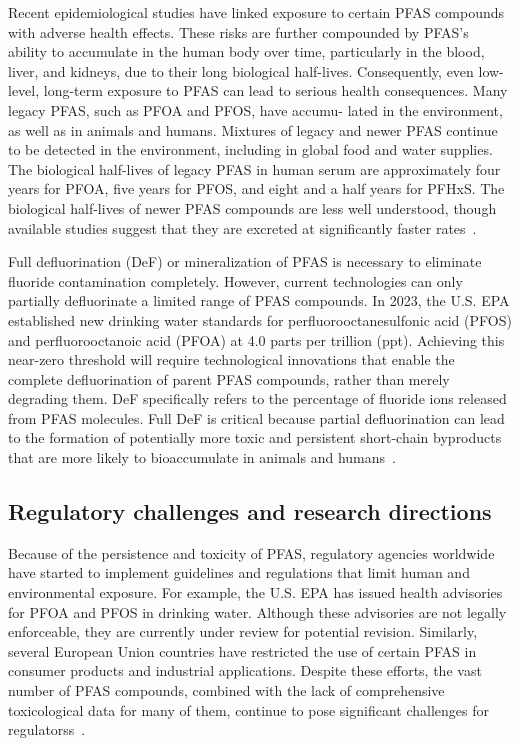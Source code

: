 Recent epidemiological studies have linked exposure to certain PFAS compounds with adverse health effects. These risks are further compounded by PFAS’s ability to accumulate in the human body over time, particularly in the blood, liver, and kidneys, due to their long biological half-lives. Consequently, even low-level, long-term exposure to PFAS can lead to serious health consequences. Many legacy PFAS, such as PFOA and PFOS, have accumu- lated in the environment, as well as in animals and humans. Mixtures of legacy and newer PFAS continue to be detected in the environment, including in global food and water supplies. The biological half-lives of legacy PFAS in human serum are approximately four years for PFOA, five years for PFOS, and eight and a half years for PFHxS. The biological half-lives of newer PFAS compounds are less well understood, though available studies suggest that they are excreted at significantly faster rates~\cite{4}.

Full defluorination (DeF) or mineralization of PFAS is necessary to eliminate fluoride contamination completely. However, current technologies can only partially defluorinate a limited range of PFAS compounds. In 2023, the U.S. EPA established new drinking water standards for perfluorooctanesulfonic acid (PFOS) and perfluorooctanoic acid (PFOA) at 4.0 parts per trillion (ppt). Achieving this near-zero threshold will require technological innovations that enable the complete defluorination of parent PFAS compounds, rather than merely degrading them. DeF specifically refers to the percentage of fluoride ions released from PFAS molecules. Full DeF is critical because partial defluorination can lead to the formation of  potentially more toxic and persistent short-chain byproducts that are more likely to bioaccumulate in animals and humans~\cite{6}.

\subsection{Regulatory challenges and research directions} \label{sec:reg_challenges}

Because of the persistence and toxicity of PFAS, regulatory agencies worldwide have started to implement guidelines and regulations that limit human and environmental exposure. For example, the U.S. EPA has issued health advisories for PFOA and PFOS in drinking water. Although these advisories are not legally enforceable, they are currently under review for potential revision. Similarly, several European Union countries have restricted the use of certain PFAS in consumer products and industrial applications. Despite these efforts, the vast number of PFAS compounds, combined with the lack of comprehensive toxicological data for many of them, continue to pose significant challenges for regulatorss~\cite{PFAS_regulators, PFAS_regulators_2, PFAS_regulators_3}.

